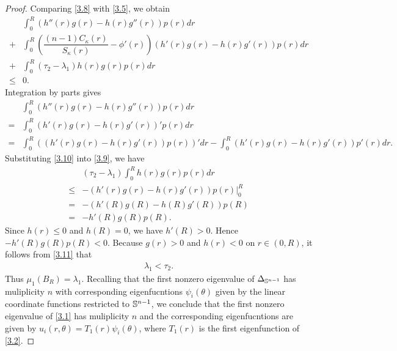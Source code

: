 \documentclass[10pt,a4paper]{amsart}
\def\S{\Bbb S}
\def\l{\lambda}
\begin{document}
\begin{proof}
Comparing \eqref{3.8} with  \eqref{3.5}, we obtain 
\begin{align}\label{3.9}
    &\int_{0}^{R}\left(h''(r)g(r)-h(r)g''(r)\right)p(r)dr\nonumber\\
    +&\int_{0}^{R}\left(\dfrac{(n-1)C_{\kappa}(r)}{S_{\kappa}(r)} - \phi'(r)\right) \left(h'(r)g(r)-h(r)g'(r)\right)p(r)dr\nonumber\\
    +&\int_{0}^{R}(\tau_2-\l_1)h(r) g(r)p(r)dr\nonumber\\
    \leq& 0.
\end{align}
Integration by parts gives
\begin{align}\label{3.10}
    &\int_{0}^{R}(h''(r)g(r)-h(r)g''(r))p(r)dr\nonumber\\
    =&\int_{0}^{R}(h'(r)g(r)-h(r)g'(r))'p(r)dr\nonumber\\
    =&\int_{0}^{R}((h'(r)g(r)-h(r)g'(r))p(r))'dr-\int_{0}^{R}(h'(r)g(r)-h(r)g'(r))p'(r)dr.
\end{align}
Substituting  \eqref{3.10} into \eqref{3.9}, we have 
\begin{align} \label{3.11}
    &(\tau_2-\l_1)\int_{0}^{R}h(r)g(r)p(r)dr\nonumber\\
    \leq& -(h'(r)g(r)-h(r)g'(r))p(r)\Big|_{0}^{R}\nonumber\\
    =&-(h'(R)g(R)-h(R)g'(R))p(R)\nonumber\\
    =&-h'(R)g(R)p(R).
\end{align}
Since $h(r)\leq 0$ and $h(R)=0$, we have $h'(R)>0$.  Hence  $-h'(R)g(R)p(R)< 0$.
Because $g(r)> 0$ and $h(r)< 0$ on $r\in (0,R)$, it follows from \eqref{3.11} that
\begin{align*}
    \l_1< \tau_2.
\end{align*}
Thus $\mu_1(B_R)=\l_1$. Recalling that the first nonzero eigenvalue of $\Delta_{\S^{n-1}}$ has muliplicity $n$ with corresponding eigenfucntions  $\psi_i(\theta)$ given by  the linear coordinate functions restricted to $\S^{n-1}$, we conclude that the first nonzero eigenvalue of \eqref{3.1} has muliplicity $n$ and the corresponding eigenfucntions are given by $u_i(r, \theta)=T_1(r)\psi_i(\theta)$, where $T_1(r)$ is the first eigenfunction of \eqref{3.2}.
\end{proof}
\end{document}
